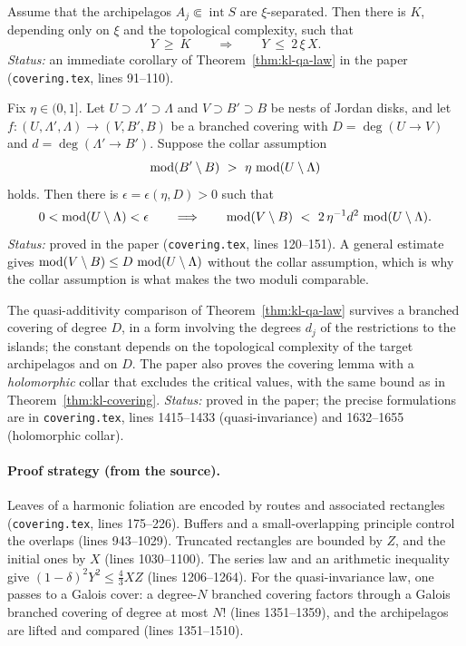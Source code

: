 \begin{theorem}
\label{thm:kl-qa-sep}
Assume that the archipelagos $A_j\Subset\operatorname{int}S$ are $\xi$-separated.  Then there is $K$,
depending only on $\xi$ and the topological complexity, such that
\[
Y\ \ge\ K\qquad\Longrightarrow\qquad Y\ \le\ 2\,\xi\,X.
\]
\emph{Status:} an immediate corollary of Theorem~\ref{thm:kl-qa-law} in the paper
(\texttt{covering.tex}, lines 91--110).
\end{theorem}

\begin{theorem}
\label{thm:kl-covering}
Fix $\eta\in(0,1]$.  Let $U\supset\Lambda'\supset\Lambda$ and $V\supset B'\supset B$ be nests of Jordan disks,
and let $f\colon(U,\Lambda',\Lambda)\to(V,B',B)$ be a branched covering with $D=\deg(U\to V)$ and
$d=\deg(\Lambda'\to B')$.  Suppose the collar assumption
\[
\modulus(B'\setminus B)\ >\ \eta\,\modulus(U\setminus\Lambda)
\]
holds.  Then there is $\epsilon=\epsilon(\eta,D)>0$ such that
\[
0<\modulus(U\setminus\Lambda)<\epsilon
\qquad\Longrightarrow\qquad
\modulus(V\setminus B)\ <\ 2\,\eta^{-1}d^2\,\modulus(U\setminus\Lambda).
\]
\emph{Status:} proved in the paper (\texttt{covering.tex}, lines 120--151).  A general estimate gives
$\operatorname{mod}(V\setminus B)\le D\,\operatorname{mod}(U\setminus\Lambda)$ without the collar assumption, which is why the
collar assumption is what makes the two moduli comparable.
\end{theorem}

\begin{proposition}
\label{prop:kl-quasi-invariance}
The quasi-additivity comparison of Theorem~\ref{thm:kl-qa-law} survives a branched covering of degree $D$,
in a form involving the degrees $d_j$ of the restrictions to the islands; the constant depends on the
topological complexity of the target archipelagos and on $D$.  The paper also proves the covering lemma with a
\emph{holomorphic} collar that excludes the critical values, with the same bound as in
Theorem~\ref{thm:kl-covering}.  \emph{Status:} proved in the paper; the precise formulations are in
\texttt{covering.tex}, lines 1415--1433 (quasi-invariance) and 1632--1655 (holomorphic collar).
\end{proposition}

\paragraph{Proof strategy (from the source).}
Leaves of a harmonic foliation are encoded by routes and associated rectangles (\texttt{covering.tex}, lines
175--226).  Buffers and a small-overlapping principle control the overlaps (lines 943--1029).  Truncated
rectangles are bounded by $Z$, and the initial ones by $X$ (lines 1030--1100).  The series law and an arithmetic
inequality give $(1-\delta)^2Y^2\le\frac43XZ$ (lines 1206--1264).  For the quasi-invariance law, one passes to a
Galois cover: a degree-$N$ branched covering factors through a Galois branched covering of degree at most $N!$
(lines 1351--1359), and the archipelagos are lifted and compared (lines 1351--1510).

